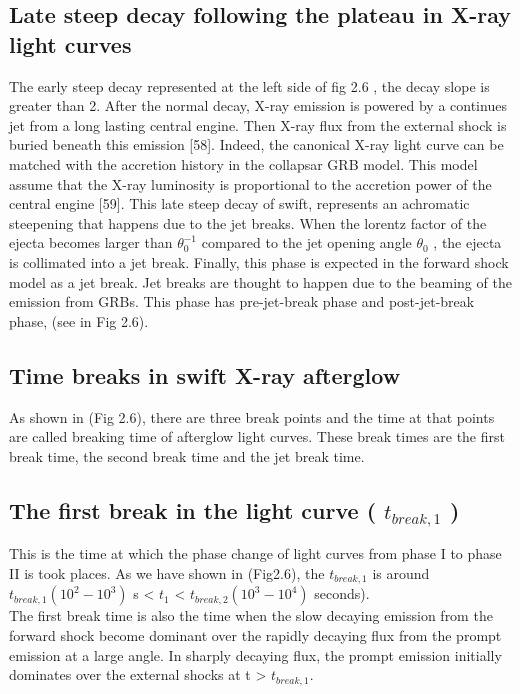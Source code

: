 \subsection{Late steep decay following the plateau in X-ray light curves}
 The early steep decay represented at the left side of fig 2.6 , the decay slope is greater than 2. After the normal decay, X-ray emission is powered by a continues jet from a long lasting central engine. Then X-ray flux from the external shock is buried beneath this emission [58]. Indeed, the canonical X-ray light curve can be matched with the accretion history in the collapsar GRB model. This model assume that the X-ray luminosity is proportional to the accretion power of the central engine [59].
This late steep decay of swift, represents an achromatic steepening that happens
due to the jet breaks. When the lorentz factor of the ejecta becomes larger than
$ \theta_{0}^{-1} $ compared to the jet opening angle $ \theta_{0} $ , the ejecta is collimated into a jet break. Finally, this phase is expected in the forward shock model as a jet break. Jet breaks are thought to happen due to the beaming of the emission from GRBs. This phase has pre-jet-break phase and post-jet-break phase, (see in Fig 2.6).\citep{44} \citep{45}
\subsection{Time breaks in swift X-ray afterglow}
As shown in (Fig 2.6), there are three break points and the time at that points are called breaking time of afterglow light curves. These break times are the first break time, the second break time and the jet break time.\\
\subsection{The first break in the light curve ( $ t_{break,1} $ )}
This is the time at which the phase change of light curves from phase I to phase II is took places. As we have shown in (Fig2.6), the $ t_{break,1} $ is around  $t_{break,1} (10^{2} - 10^{3} ) $ s  < $ t_{1} $ <  $ t_{break,2}( 10^{3} - 10^{4})$ seconds).\\
The first break time is also the time when the slow decaying emission from the
forward shock become dominant over the rapidly decaying flux from the prompt
emission at a large angle. In sharply decaying flux, the prompt emission initially
dominates over the external shocks at t > $ t_{break,1} $\citep{46}.
